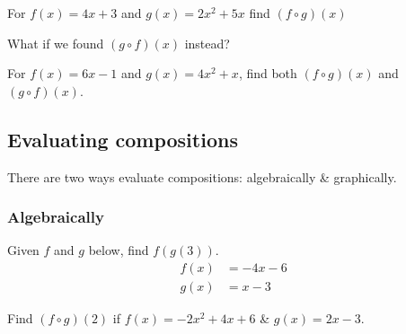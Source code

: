\begin{exercise}
For $f(x)=4x+3$ and $g(x)=2x^2+5x$ find $(f\circ g)(x)$
\end{exercise}
\begin{solution}[1.5in]

\end{solution}
\vspace{0.5em}

\ifprintanswers\else\newpage\fi

\begin{exercise}
What if we found $(g\circ f)(x)$ instead?
\end{exercise}
\begin{solution}[1.5in]

\end{solution}
\vspace{0.5em}

\begin{exercise}
For $f(x)=6x-1$ and $g(x)=4x^2+x$, find both $(f\circ g)(x)$ and
$(g\circ f)(x)$.
\end{exercise}
\begin{solution}[2in]

\end{solution}
\vspace{0.5em}

\ifprintanswers\else\newpage\fi

\subsection{Evaluating compositions}

There are two ways evaluate compositions: algebraically \& graphically.

\subsubsection*{Algebraically}

\begin{exercise}
Given $f$ and $g$ below, find $f(g(3))$.
\begin{align*}
f(x)&=-4x-6\\
g(x)&=x-3
\end{align*}
\end{exercise}
\begin{solution}[3in]

\end{solution}
\vspace{0.5em}

\begin{exercise}
Find $(f\circ g)(2)$ if $f(x)=-2x^2+4x+6$ \& $g(x)=2x-3$.
\end{exercise}
\begin{solution}[2in]

\end{solution}
\vspace{0.5em}

